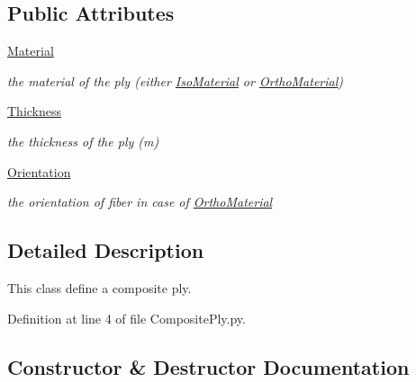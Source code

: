 \subsection*{Public Attributes}
\begin{DoxyCompactItemize}
\item 
\hyperlink{classgebtaero_1_1_composite_ply_1_1_composite_ply_a5ec1ca6af4be2e10bab777f29f469e3e}{Material}
\begin{DoxyCompactList}\small\item\em the material of the ply (either \hyperlink{namespacegebtaero_1_1_iso_material}{Iso\+Material} or \hyperlink{namespacegebtaero_1_1_ortho_material}{Ortho\+Material}) \end{DoxyCompactList}\item 
\hyperlink{classgebtaero_1_1_composite_ply_1_1_composite_ply_a0356871876ebf481a0d252f6db1171da}{Thickness}
\begin{DoxyCompactList}\small\item\em the thickness of the ply (m) \end{DoxyCompactList}\item 
\hyperlink{classgebtaero_1_1_composite_ply_1_1_composite_ply_a17a90c6f267e88387ac5c06a3dad1cc7}{Orientation}
\begin{DoxyCompactList}\small\item\em the orientation of fiber in case of \hyperlink{namespacegebtaero_1_1_ortho_material}{Ortho\+Material} \end{DoxyCompactList}\end{DoxyCompactItemize}


\subsection{Detailed Description}
This class define a composite ply. 

Definition at line 4 of file Composite\+Ply.\+py.



\subsection{Constructor \& Destructor Documentation}
\mbox{\label{classgebtaero_1_1_composite_ply_1_1_composite_ply_a1165011eca12a4b958aee5cfda595258}} 
